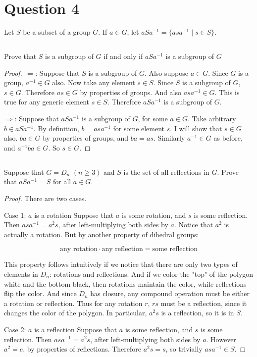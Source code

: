 \documentclass[a4paper,12pt]{article}
\begin{document}
\section{Question 4}
Let $S$ be a subset of a group $G$. If $a \in G$, let $aSa^{-1} = \{ asa^{-1} \mid s \in S \}$.

\subsection{}
Prove that $S$ is a subgroup of $G$ if and only if $aSa^{-1}$ is a subgroup of $G$

\begin{proof}
$\Leftarrow$: Suppose that $S$ is a subgroup of $G$. Also suppose $a \in G$. Since $G$ is a group, $a^{-1} \in G$ also. Now take any element $s \in S$. Since $S$ is a subgroup of $G$, $s \in G$. Therefore $as \in G$ by properties of groups. And also $asa^{-1} \in G$. This is true for any generic element $s \in S$. Therefore $aSa^{-1}$ is a subgroup of $G$.

$\Rightarrow$: Suppose that $aSa^{-1}$ is a subgroup of $G$, for some $a \in G$. Take arbitrary $b \in aSa^{-1}$. By definition, $b = asa^{-1}$ for some element $s$. I will show that $s \in G$ also. $ba \in G$ by properties of groups, and $ba = as$. Similarly $a^{-1} \in G$ as before, and $a^{-1}ba \in G$. So $s \in G$.
\end{proof}

\subsection{}

Suppose that $G = D_n$ $(n \geq 3)$ and $S$ is the set of all reflections in $G$. Prove that
$aSa^{-1} = S$ for all $a \in G$.

\begin{proof}
There are two cases.

Case 1: $a$ is a rotation
Suppose that $a$ is some rotation, and $s$ is some reflection. Then $asa^{-1} = a^2s$, after left-multiplying both sides by $a$. Notice that $a^2$ is actually a rotation. But by another property of dihedral groups:

\begin{equation*}
\text{any rotation} \cdot \text{any reflection} = \text{some reflection}
\end{equation*}

This property follows intuitively if we notice that there are only two types of elements in $D_n$: rotations and reflections. And if we color the "top" of the polygon white and the bottom black, then rotations maintain the color, while reflections flip the color. And since $D_n$ has closure, any compound operation must be either a rotation or reflection. Thus for any rotation $r$, $rs$ must be a reflection, since it changes the color of the polygon. In particular, $a^2s$ is a reflection, so it is in $S$.

Case 2: $a$ is a reflection
Suppose that $a$ is some reflection, and $s$ is some reflection. Then $asa^{-1} = a^2s$, after left-multiplying both sides by $a$. However $a^2 = e$, by properties of reflections. Therefore $a^2s = s$, so trivially $asa^{-1} \in S$. 
\end{proof}
\end{document}
